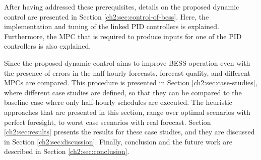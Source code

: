 After having addressed these prerequisites, details on the proposed dynamic control are presented in Section \ref{ch2:sec:control-of-bess}.
Here, the implementation and tuning of the linked PID controllers is explained.
Furthermore, the MPC that is required to produce inputs for one of the PID controllers is also explained.

Since the proposed dynamic control aims to improve BESS operation even with the presence of errors in the half-hourly forecasts, forecast quality, and different MPCs are compared.
This procedure is presented in Section \ref{ch2:sec:case-studies}, where different case studies are defined, so that they can be compared to the baseline case where only half-hourly schedules are executed.
The heuristic approaches that are presented in this section, range over optimal scenarios with perfect foresight, to worst case scenarios with real forecast.
Section \ref{ch2:sec:results} presents the results for these case studies, and they are discussed in Section \ref{ch2:sec:discussion}.
Finally, conclusion and the future work are described in Section \ref{ch2:sec:conclusion}.










